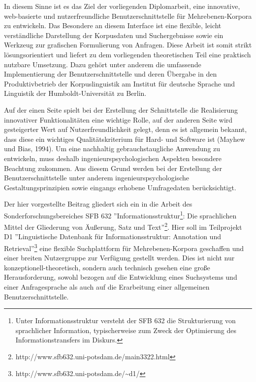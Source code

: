 In diesem Sinne ist es das Ziel der vorliegenden Diplomarbeit, eine innovative, web-basierte und nutzerfreundliche Benutzerschnittstelle für Mehrebenen-Korpora zu entwickeln. Das Besondere an diesem Interface ist eine flexible, leicht verständliche Darstellung der Korpusdaten und Suchergebnisse sowie ein Werkzeug zur grafischen Formulierung von Anfragen.
Diese Arbeit ist somit strikt lösungsorientiert und liefert zu dem vorliegenden theoretischen Teil eine praktisch nutzbare Umsetzung. Dazu gehört unter anderem die umfassende Implementierung der Benutzerschnittstelle und deren Übergabe in den Produktivbetrieb der Korpuslinguistik am Institut für deutsche Sprache und Linguistik der Humboldt-Universität zu Berlin.

Auf der einen Seite spielt bei der Erstellung der Schnittstelle die Realisierung innovativer Funktionalitäten eine wichtige Rolle, auf der anderen Seite wird gesteigerter Wert auf Nutzerfreundlichkeit gelegt, denn es ist allgemein bekannt, dass diese ein wichtiges Qualitätskriterium für Hard- und Software ist (Mayhew und Bias, 1994). Um eine nachhaltig gebrauchstaugliche Anwendung zu entwickeln, muss deshalb ingenieurspsychologischen Aspekten besondere Beachtung zukommen. Aus diesem Grund werden bei der Erstellung der Benutzerschnittstelle unter anderem ingenieurspsychologische Gestaltungsprinzipien sowie eingangs erhobene Umfragedaten berücksichtigt.



Der hier vorgestellte Beitrag gliedert sich ein in die Arbeit des Sonderforschungsbereiches SFB 632 ''Informationsstruktur\footnote{Unter Informationsstruktur versteht der SFB 632 die Strukturierung von sprachlicher Information, typischerweise zum Zweck der Optimierung des Informationstransfers im Diskurs.}: Die sprachlichen Mittel der Gliederung von Äußerung, Satz und Text''\footnote{http://www.sfb632.uni-potsdam.de/main3322.html}. Hier soll im Teilprojekt D1 ''Linguistische Datenbank für Informationsstruktur: Annotation und Retrieval''\footnote{http://www.sfb632.uni-potsdam.de/\~{ }d1/} eine flexible Suchplattform für Mehrebenen-Korpora geschaffen und einer breiten Nutzergruppe zur Verfügung gestellt werden. Dies ist nicht nur konzeptionell-theoretisch, sondern auch technisch gesehen eine große Herausforderung, sowohl bezogen auf die Entwicklung eines Suchsystems und einer Anfragesprache als auch auf die Erarbeitung einer allgemeinen Benutzerschnittstelle.

